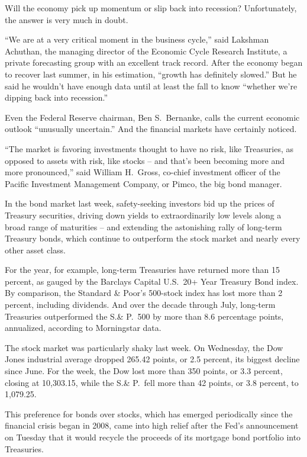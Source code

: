 ﻿\documentclass[12pt]{article}
\begin{document}
Will the economy pick up momentum or slip back into recession? Unfortunately, the answer is very
much in doubt.

``We are at a very critical moment in the business cycle,'' said Lakshman Achuthan, the managing
director of the Economic Cycle Research Institute, a private forecasting group with an excellent
track record. After the economy began to recover last summer, in his estimation, ``growth has
definitely slowed.'' But he said he wouldn't have enough data until at least the fall to know
``whether we're dipping back into recession.''

Even the Federal Reserve chairman, Ben S.~Bernanke, calls the current economic outlook ``unusually
uncertain.'' And the financial markets have certainly noticed.

``The market is favoring investments thought to have no risk, like Treasuries, as opposed to assets
with risk, like stocks -- and that's been becoming more and more pronounced,'' said William
H.~Gross, co-chief investment officer of the Pacific Investment Management Company, or Pimco, the
big bond manager.

In the bond market last week, safety-seeking investors bid up the prices of Treasury securities,
driving down yields to extraordinarily low levels along a broad range of maturities -- and extending
the astonishing rally of long-term Treasury bonds, which continue to outperform the stock market and
nearly every other asset class.

For the year, for example, long-term Treasuries have returned more than 15 percent, as gauged by the
Barclays Capital U.S.~20+ Year Treasury Bond index. By comparison, the Standard \& Poor's 500-stock
index has lost more than 2 percent, including dividends. And over the decade through July, long-term
Treasuries outperformed the S.\& P.~500 by more than 8.6 percentage points, annualized, according to
Morningstar data.

The stock market was particularly shaky last week. On Wednesday, the Dow Jones industrial average
dropped 265.42 points, or 2.5 percent, its biggest decline since June. For the week, the Dow lost
more than 350 points, or 3.3 percent, closing at 10,303.15, while the S.\& P.~fell more than 42
points, or 3.8 percent, to 1,079.25.

This preference for bonds over stocks, which has emerged periodically since the financial crisis
began in 2008, came into high relief after the Fed's announcement on Tuesday that it would recycle
the proceeds of its mortgage bond portfolio into Treasuries.
\end{document}
